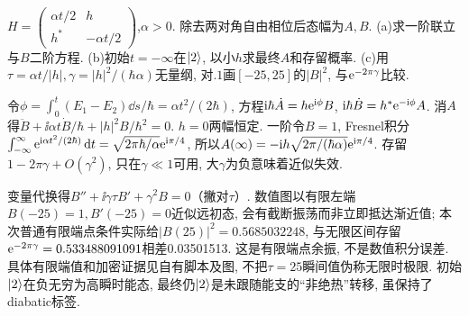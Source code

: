 \begin{exercise}
$H=\begin{pmatrix}\alpha t/2&h\\h^*&-\alpha t/2\end{pmatrix}$,$\alpha>0$. 除去两对角自由相位后态幅为$A,B$. (a)求一阶联立与$B$二阶方程. (b)初始$t=-\infty$在$\lvert 2\rangle$, 以小$h$求最终$A$和存留概率. (c)用$\tau=\alpha t/|h|,\gamma=|h|^2/(\hbar\alpha)$无量纲, 对$.1$画$[-25,25]$的$|B|^2$, 与$\mathrm e^{-2\pi\gamma}$比较.
\end{exercise}
\begin{solution}
令$\phi=\int_0^t(E_1-E_2)\dd s/\hbar=\alpha t^2/(2\hbar)$, 方程$\mathrm i\hbar\dot A=h\mathrm e^{\mathrm i\phi}B$, $\mathrm i\hbar\dot B=h^*\mathrm e^{-\mathrm i\phi}A$. 消$A$得$\ddot B+\ii\alpha t\dot B/\hbar+|h|^2B/\hbar^2=0$. $h=0$两幅恒定. 一阶令$B=1$, Fresnel积分$\int_{-\infty}^{\infty}\mathrm e^{\mathrm i\alpha t^2/(2\hbar)}\,\mathrm d t=\sqrt{2\pi\hbar/\alpha}\mathrm e^{\mathrm i\pi/4}$, 所以$A(\infty)=-\mathrm i h\sqrt{2\pi/(\hbar\alpha)}\mathrm e^{\mathrm i\pi/4}$. 存留$1-2\pi\gamma+O(\gamma^2)$, 只在$\gamma\ll1$可用, 大$\gamma$为负意味着近似失效.

变量代换得$B''+\ii\gamma\tau B'+\gamma^2B=0$（撇对$\tau$）. 数值图以有限左端$B(-25)=1,B'(-25)=0$近似远初态, 会有截断振荡而非立即抵达渐近值; 本次普通有限端点条件实际给$|B(25)|^2=0.5685032248$, 与无限区间存留$\mathrm e^{-2\pi\gamma}=0.533488091091$相差0.03501513. 这是有限端点余振, 不是数值积分误差. 具体有限端值和加密证据见自有脚本及图, 不把$\tau=25$瞬间值伪称无限时极限. 初始$\lvert 2\rangle$在负无穷为高瞬时能态, 最终仍$\lvert 2\rangle$是未跟随能支的“非绝热”转移, 虽保持了diabatic标签.

\end{solution}
